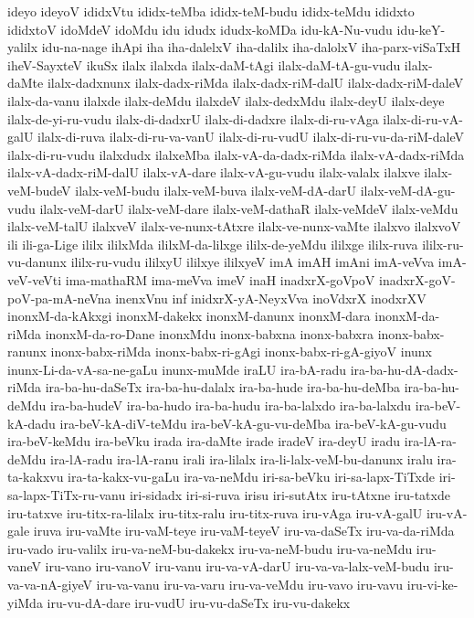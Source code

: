 {ideyo
ideyoV
ididxVtu
ididx-teMba
ididx-teM-budu
ididx-teMdu
ididxto
ididxtoV
idoMdeV
idoMdu
idu
idudx
idudx-koMDa
idu-kA-Nu-vudu
idu-keY-yalilx
idu-na-nage
ihApi
iha
iha-dalelxV
iha-dalilx
iha-dalolxV
iha-parx-viSaTxH
iheV-SayxteV
ikuSx
ilalx
ilalxda
ilalx-daM-tAgi
ilalx-daM-tA-gu-vudu
ilalx-daMte
ilalx-dadxnunx
ilalx-dadx-riMda
ilalx-dadx-riM-dalU
ilalx-dadx-riM-daleV
ilalx-da-vanu
ilalxde
ilalx-deMdu
ilalxdeV
ilalx-dedxMdu
ilalx-deyU
ilalx-deye
ilalx-de-yi-ru-vudu
ilalx-di-dadxrU
ilalx-di-dadxre
ilalx-di-ru-vAga
ilalx-di-ru-vA-galU
ilalx-di-ruva
ilalx-di-ru-va-vanU
ilalx-di-ru-vudU
ilalx-di-ru-vu-da-riM-daleV
ilalx-di-ru-vudu
ilalxdudx
ilalxeMba
ilalx-vA-da-dadx-riMda
ilalx-vA-dadx-riMda
ilalx-vA-dadx-riM-dalU
ilalx-vA-dare
ilalx-vA-gu-vudu
ilalx-valalx
ilalxve
ilalx-veM-budeV
ilalx-veM-budu
ilalx-veM-buva
ilalx-veM-dA-darU
ilalx-veM-dA-gu-vudu
ilalx-veM-darU
ilalx-veM-dare
ilalx-veM-dathaR
ilalx-veMdeV
ilalx-veMdu
ilalx-veM-talU
ilalxveV
ilalx-ve-nunx-tAtxre
ilalx-ve-nunx-vaMte
ilalxvo
ilalxvoV
ili
ili-ga-Lige
ililx
ililxMda
ililxM-da-lilxge
ililx-de-yeMdu
ililxge
ililx-ruva
ililx-ru-vu-danunx
ililx-ru-vudu
ililxyU
ililxye
ililxyeV
imA
imAH
imAni
imA-veVva
imA-veV-veVti
ima-mathaRM
ima-meVva
imeV
inaH
inadxrX-goVpoV
inadxrX-goV-poV-pa-mA-neVna
inenxVnu
inf
inidxrX-yA-NeyxVva
inoVdxrX
inodxrXV
inonxM-da-kAkxgi
inonxM-dakekx
inonxM-danunx
inonxM-dara
inonxM-da-riMda
inonxM-da-ro-Dane
inonxMdu
inonx-babxna
inonx-babxra
inonx-babx-ranunx
inonx-babx-riMda
inonx-babx-ri-gAgi
inonx-babx-ri-gA-giyoV
inunx
inunx-Li-da-vA-sa-ne-gaLu
inunx-muMde
iraLU
ira-bA-radu
ira-ba-hu-dA-dadx-riMda
ira-ba-hu-daSeTx
ira-ba-hu-dalalx
ira-ba-hude
ira-ba-hu-deMba
ira-ba-hu-deMdu
ira-ba-hudeV
ira-ba-hudo
ira-ba-hudu
ira-ba-lalxdo
ira-ba-lalxdu
ira-beV-kA-dadu
ira-beV-kA-diV-teMdu
ira-beV-kA-gu-vu-deMba
ira-beV-kA-gu-vudu
ira-beV-keMdu
ira-beVku
irada
ira-daMte
irade
iradeV
ira-deyU
iradu
ira-lA-ra-deMdu
ira-lA-radu
ira-lA-ranu
irali
ira-lilalx
ira-li-lalx-veM-bu-danunx
iralu
ira-ta-kakxvu
ira-ta-kakx-vu-gaLu
ira-va-neMdu
iri-sa-beVku
iri-sa-lapx-TiTxde
iri-sa-lapx-TiTx-ru-vanu
iri-sidadx
iri-si-ruva
irisu
iri-sutAtx
iru-tAtxne
iru-tatxde
iru-tatxve
iru-titx-ra-lilalx
iru-titx-ralu
iru-titx-ruva
iru-vAga
iru-vA-galU
iru-vA-gale
iruva
iru-vaMte
iru-vaM-teye
iru-vaM-teyeV
iru-va-daSeTx
iru-va-da-riMda
iru-vado
iru-valilx
iru-va-neM-bu-dakekx
iru-va-neM-budu
iru-va-neMdu
iru-vaneV
iru-vano
iru-vanoV
iru-vanu
iru-va-vA-darU
iru-va-va-lalx-veM-budu
iru-va-va-nA-giyeV
iru-va-vanu
iru-va-varu
iru-va-veMdu
iru-vavo
iru-vavu
iru-vi-ke-yiMda
iru-vu-dA-dare
iru-vudU
iru-vu-daSeTx
iru-vu-dakekx
}
